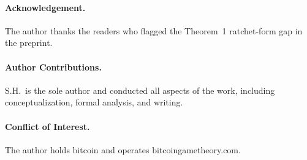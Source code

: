 \documentclass[12pt]{article}
\theoremstyle{definition}
\theoremstyle{remark}
\begin{document}
\paragraph*{Acknowledgement.}

The author thanks the readers who flagged the Theorem~1
ratchet-form gap in the preprint.


\paragraph*{Author Contributions.}
S.H.\ is the sole author and conducted all aspects of the work,
including conceptualization, formal analysis, and writing.

\paragraph*{Conflict of Interest.}
The author holds bitcoin and operates bitcoingametheory.com.
\end{document}
